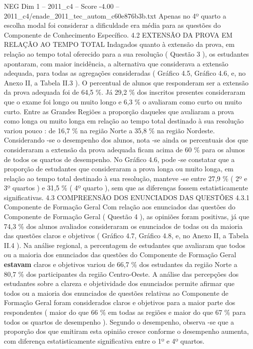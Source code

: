 \begin{textsample}{NEG Dim 1 – 2011\_c4 – Score -4.00 – 2011\_c4/enade\_2011\_tec\_autom\_c60e876b3b.txt}
Apenas no 4º quarto a escolha modal foi considerar a dificuldade era média para as questões do Componente de Conhecimento Específico. 4.2 EXTENSÃO DA PROVA EM RELAÇÃO AO TEMPO TOTAL Indagados quanto à extensão da prova, em relação ao tempo total oferecido para a sua resolução ( Questão 3 ), os estudantes apontaram, com maior incidência, a alternativa que considerava a extensão adequada, para todas as agregações consideradas ( Gráfico 4.5, Gráfico 4.6, e, no Anexo II, a Tabela II.3 ).
O percentual de alunos que responderam ser a extensão da prova adequada foi de 64,5 \%.
Já 29,2 \% dos inscritos presentes consideraram que o exame foi longo ou muito longo e 6,3 \% o avaliaram como curto ou muito curto.
Entre as Grandes Regiões a proporção daqueles que avaliaram a prova como longa ou muito longa em relação ao tempo total destinado à sua resolução variou pouco : de 16,7 \% na região Norte a 35,8 \% na região Nordeste.
Considerando -se o desempenho dos alunos, nota -se ainda os percentuais dos que consideraram a extensão da prova adequada ficam acima de 60 \% para os alunos de todos os quartos de desempenho.
No Gráfico 4.6, pode -se constatar que a proporção de estudantes que consideraram a prova longa ou muito longa, em relação ao tempo total destinado à sua resolução, manteve -se entre 27,9 \% ( 2º e 3º quartos ) e 31,5 \% ( 4º quarto ), sem que as diferenças fossem estatisticamente significativas. 4.3 COMPREENSÃO DOS ENUNCIADOS DAS QUESTÕES 4.3.1 Componente de Formação Geral Com relação aos enunciados das questões do Componente de Formação Geral ( Questão 4 ), as opiniões foram positivas, já que 74,3 \% dos alunos avaliados consideraram os enunciados de todas ou da maioria das questões claros e objetivos ( Gráfico 4.7, Gráfico 4.8, e, no Anexo II, a Tabela II.4 ).
Na análise regional, a percentagem de estudantes que avaliaram que todos ou a maioria dos enunciados das questões do Componente de Formação Geral \textbf{estavam} claros e objetivos variou de 66,7 \% dos estudantes da região Norte a 80,7 \% dos participantes da região Centro-Oeste.
A análise das percepções dos estudantes sobre a clareza e objetividade dos enunciados permite afirmar que todos ou a maioria dos enunciados de questões relativas ao Componente de Formação Geral foram considerados claros e objetivos para a maior parte dos respondentes ( maior do que 66 \% em todas as regiões e maior do que 67 \% para todos os quartos de desempenho ).
Segundo o desempenho, observa -se que a proporção dos que emitiram esta opinião cresce conforme o desempenho aumenta, com diferença estatisticamente significativa entre o 1º e 4º quartos.

\end{textsample}
